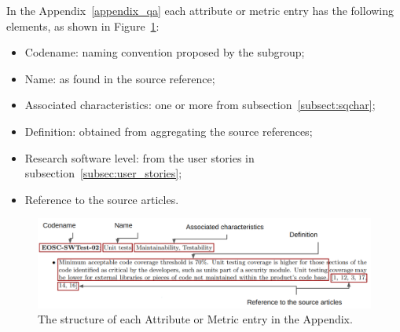 In the Appendix~\ref{appendix_qa} each attribute or metric entry has the following elements, as shown in Figure~\ref{fig:sqattr}:

\begin{itemize}
    \item Codename: naming convention proposed by the subgroup;
    \item Name: as found in the source reference;
    \item Associated characteristics: one or more from subsection~\ref{subsect:sqchar};
    \item Definition: obtained from aggregating the source references;
    \item Research software level: from the user stories in subsection~\ref{subsec:user_stories}; 
    \item Reference to the source articles.
\end{itemize}

\begin{figure}[h]
    \centering
    \includegraphics[width=0.99\linewidth]{imgs/qa.png}
    \caption{The structure of each Attribute or Metric entry in the Appendix.}
    \label{fig:sqattr}
\end{figure}
